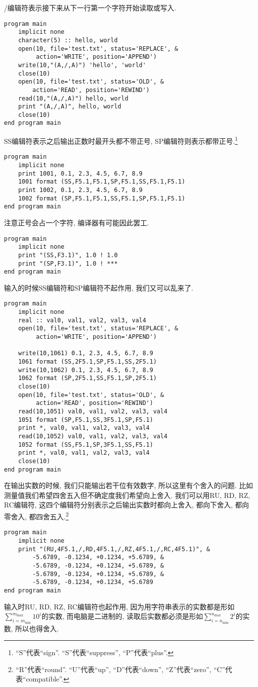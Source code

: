 /编辑符表示接下来从下一行第一个字符开始读取或写入.
\begin{verbatim}
program main
    implicit none
    character(5) :: hello, world
    open(10, file='test.txt', status='REPLACE', &
         action='WRITE', position='APPEND')
    write(10,"(A,/,A)") 'hello', 'world'
    close(10)
    open(10, file='test.txt', status='OLD', &
        action='READ', position='REWIND')
    read(10,"(A,/,A)") hello, world
    print "(A,/,A)", hello, world
    close(10)
end program main
\end{verbatim}

SS编辑符表示之后输出正数时最开头都不带正号, SP编辑符则表示都带正号.\footnote{``S''代表``sign''. ``S''代表``suppress'', ``P''代表``plus''.}
\begin{verbatim}
program main
    implicit none
    print 1001, 0.1, 2.3, 4.5, 6.7, 8.9
    1001 format (SS,F5.1,F5.1,SP,F5.1,SS,F5.1,F5.1)
    print 1002, 0.1, 2.3, 4.5, 6.7, 8.9
    1002 format (SP,F5.1,F5.1,SS,F5.1,SP,F5.1,F5.1)
end program main
\end{verbatim}
注意正号会占一个字符, 编译器有可能因此罢工.
\begin{verbatim}
program main
    implicit none
    print "(SS,F3.1)", 1.0 ! 1.0
    print "(SP,F3.1)", 1.0 ! ***
end program main
\end{verbatim}
输入的时候SS编辑符和SP编辑符不起作用, 我们又可以乱来了.
\begin{verbatim}
program main
    implicit none
    real :: val0, val1, val2, val3, val4
    open(10, file='test.txt', status='REPLACE', &
         action='WRITE', position='APPEND')

    write(10,1061) 0.1, 2.3, 4.5, 6.7, 8.9
    1061 format (SS,2F5.1,SP,F5.1,SS,2F5.1)
    write(10,1062) 0.1, 2.3, 4.5, 6.7, 8.9
    1062 format (SP,2F5.1,SS,F5.1,SP,2F5.1)
    close(10)
    open(10, file='test.txt', status='OLD', &
         action='READ', position='REWIND')
    read(10,1051) val0, val1, val2, val3, val4
    1051 format (SP,F5.1,SS,3F5.1,SP,F5.1)
    print *, val0, val1, val2, val3, val4
    read(10,1052) val0, val1, val2, val3, val4
    1052 format (SS,F5.1,SP,3F5.1,SS,F5.1)
    print *, val0, val1, val2, val3, val4
    close(10)
end program main
\end{verbatim}

在输出实数的时候, 我们只能输出若干位有效数字, 所以这里有个舍入的问题. 比如测量值我们希望四舍五入但不确定度我们希望向上舍入. 我们可以用RU, RD, RZ, RC编辑符, 这四个编辑符分别表示之后输出实数时都向上舍入, 都向下舍入, 都向零舍入, 都四舍五入.\footnote{``R''代表``round''. ``U''代表``up'', ``D''代表``down'', ``Z''代表``zero'', ``C''代表``compatible''.}
\begin{verbatim}
program main
    implicit none
    print "(RU,4F5.1,/,RD,4F5.1,/,RZ,4F5.1,/,RC,4F5.1)", &
        -5.6789, -0.1234, +0.1234, +5.6789, &
        -5.6789, -0.1234, +0.1234, +5.6789, &
        -5.6789, -0.1234, +0.1234, +5.6789, &
        -5.6789, -0.1234, +0.1234, +5.6789
end program main
\end{verbatim}
输入时RU, RD, RZ, RC编辑符也起作用, 因为用字符串表示的实数都是形如$\sum_{i=m_\text{min}}^{m_\text{max}}10^{i}$的实数, 而电脑是二进制的, 读取后实数都必须是形如$\sum_{i=n_\text{min}}^{n_\text{max}}2^{i}$的实数, 所以也得舍入.

